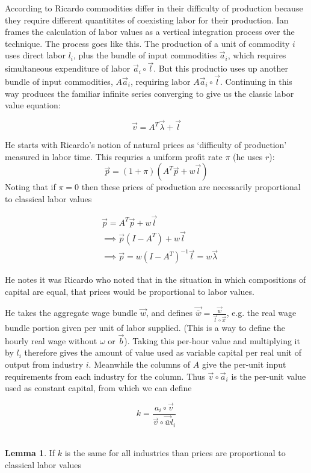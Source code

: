 \documentclass{article}
\theoremstyle{definition}
\newtheorem{lemma}{Lemma}[section]
\begin{document}
According to Ricardo commodities differ in their difficulty of production because they require different quantitites of coexisting labor for their production. Ian frames the calculation of labor values as a vertical integration process over the technique. The process goes like this. The production of a unit of commodity $i$ uses direct labor $l_i$, plus the bundle of input commodities $\vec{a}_i$, which requires simultaneous expenditure of labor $\vec{a}_i \circ \vec{l}$. But this productio uses up another bundle of input commodities, $A\vec{a}_i$, requiring labor $A\vec{a}_i\circ \vec{l}$. Continuing in this way produces the familiar infinite series converging to give us the classic labor value equation:

\[ \vec{v} = A^T\vec{\lambda} + \vec{l} \]

He starts with Ricardo's notion of natural prices as `difficulty of production' measured in labor time. This requries a uniform profit rate $\pi$ (he uses $r$):
\[
    \vec{p} = (1+\pi)(A^T\vec{p} + w\vec{l})
\]
Noting that if $\pi = 0$ then these prices of production are necessarily proportional to classical labor values

\begin{align}
   & \vec{p} = A^T\vec{p} + w\vec{l} \\
   &\implies \vec{p}(I-A^T) + w\vec{l} \\
   &\implies \vec{p} = w(I-A^T)^{-1}\vec{l} = w\vec{\lambda}
\end{align}

He notes it was Ricardo who noted that in the situation in which compositions of capital are equal, that prices would be proportional to labor values. 

He takes the aggregate wage bundle $\vec{w}$, and defines $\vec{\bar{w}} = \frac{\vec{w}}{\vec{l}\circ \vec{x}}$, e.g. the real wage bundle portion given per unit of labor supplied. (This is a way to define the hourly real wage without $\omega$ or $\vec{b}$). Taking this per-hour value and multiplying it by $l_i$ therefore gives the amount of value used as variable capital per real unit of output from industry $i$. Meanwhile the columns of $A$ give the per-unit input requirements from each industry for the column. Thus $\vec{v}\circ \vec{a}_i$ is the per-unit value used as constant capital, from which we can define 

\[ k = \frac{{a}_i \circ \vec{v}}{\vec{v}\circ \vec{\bar{w}}l_i} \]
\
\begin{lemma}
    If $k$ is the same for all industries than prices are proportional to classical labor values
\end{lemma}
\end{document}

